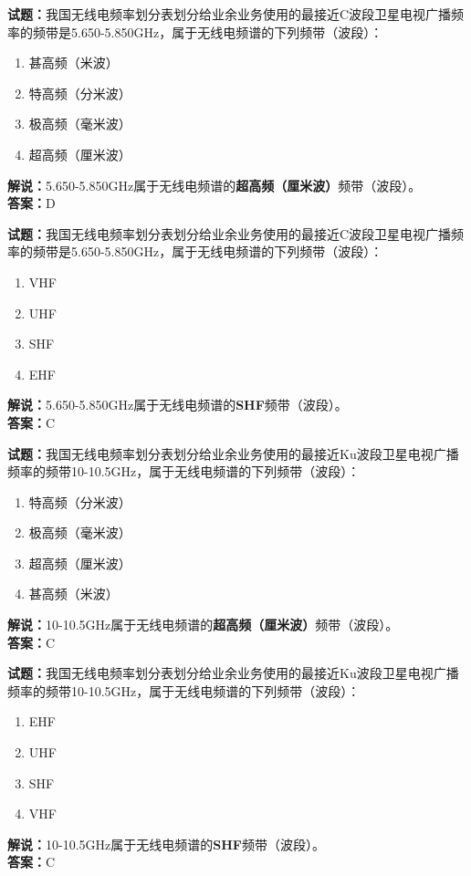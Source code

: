 \documentclass{ctexbook}
\begin{document}
\noindent\textbf{试题：}我国无线电频率划分表划分给业余业务使用的最接近C波段卫星电视广播频率的频带是5.650-5.850\unit{\GHz}，属于无线电频谱的下列频带（波段）：
\begin{enumerate}[leftmargin=3em]
\item 甚高频（米波）
\item 特高频（分米波）
\item 极高频（毫米波）
\item 超高频（厘米波）
\end{enumerate}
\noindent\textbf{解说：}5.650-5.850\unit{\GHz}属于无线电频谱的\textbf{超高频（厘米波）}频带（波段）。\\\noindent\textbf{答案：}D

\bigskip




\noindent\textbf{试题：}我国无线电频率划分表划分给业余业务使用的最接近C波段卫星电视广播频率的频带是5.650-5.850\unit{\GHz}，属于无线电频谱的下列频带（波段）：
\begin{enumerate}[leftmargin=3em]
\item VHF
\item UHF
\item SHF
\item EHF
\end{enumerate}
\noindent\textbf{解说：}5.650-5.850\unit{\GHz}属于无线电频谱的\textbf{SHF}频带（波段）。\\\noindent\textbf{答案：}C

\bigskip




\noindent\textbf{试题：}我国无线电频率划分表划分给业余业务使用的最接近Ku波段卫星电视广播频率的频带10-10.5\unit{\GHz}，属于无线电频谱的下列频带（波段）：
\begin{enumerate}[leftmargin=3em]
\item 特高频（分米波）
\item 极高频（毫米波）
\item 超高频（厘米波）
\item 甚高频（米波）
\end{enumerate}
\noindent\textbf{解说：}10-10.5\unit{\GHz}属于无线电频谱的\textbf{超高频（厘米波）}频带（波段）。\\\noindent\textbf{答案：}C

\bigskip




\noindent\textbf{试题：}我国无线电频率划分表划分给业余业务使用的最接近Ku波段卫星电视广播频率的频带10-10.5\unit{\GHz}，属于无线电频谱的下列频带（波段）：
\begin{enumerate}[leftmargin=3em]
\item EHF
\item UHF
\item SHF
\item VHF
\end{enumerate}
\noindent\textbf{解说：}10-10.5\unit{\GHz}属于无线电频谱的\textbf{SHF}频带（波段）。\\\noindent\textbf{答案：}C
\end{document}
